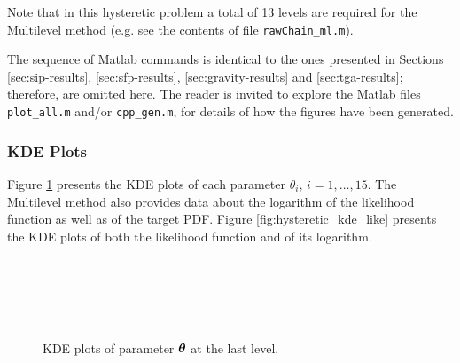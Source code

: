 Note that in this hysteretic problem a total of 13 levels are required for the Multilevel method (e.g. see the contents of file \texttt{rawChain\_ml.m}).

The sequence of Matlab commands is identical to the ones presented in Sections
\ref{sec:sip-results}, \ref{sec:sfp-results}, \ref{sec:gravity-results} and \ref{sec:tga-results};
therefore, are omitted here. The reader is invited to explore the Matlab files
\texttt{plot\_all.m} and/or  \texttt{cpp\_gen.m},  for details of how the figures have been generated.



\subsubsection{KDE Plots}

Figure \ref{fig:hysteretic_kde} presents the KDE plots of each parameter $\theta_i,\, i=1,\ldots,15$.
The Multilevel method also provides data about the logarithm of the likelihood function as well as of the target PDF.
Figure \ref{fig:hysteretic_kde_like} presents the KDE plots of both the likelihood function and of its logarithm.



\begin{figure}[hptb]
\centering
{}
\\
\\
\\
\\
\caption{KDE plots of parameter $\mbox{\boldmath$ \theta $}$ at the last level.}
\label{fig:hysteretic_kde}
\end{figure}



